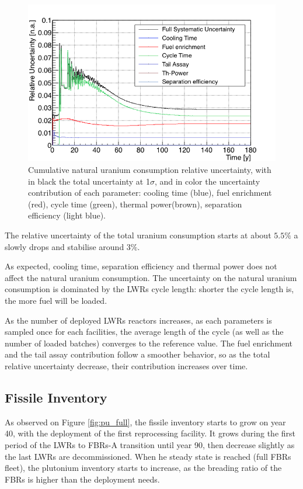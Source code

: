 \documentclass{anstrans}
\begin{document}
\begin{figure}[h!!] %
    \centering
    \includegraphics[scale=0.35]{unat_uncer}
    \caption{Cumulative natural uranium consumption relative uncertainty, with
    in black the total uncertainty at 1$\sigma$, and in color the uncertainty
    contribution of each parameter: cooling time (blue), fuel enrichment (red),
    cycle time (green), thermal power(brown), separation efficiency (light
    blue).}\label{fig:unatr_uncer}
\end{figure}
The relative uncertainty of the total uranium consumption starts at about
$5.5\%$ a slowly drops and stabilise around $3\%$.

As expected, cooling time, separation efficiency and thermal power does
not affect the natural uranium consumption.
The uncertainty on the natural uranium consumption is dominated by the
\glspl{LWR} cycle length: shorter the cycle length is, the more fuel will be
loaded.  

As the number of deployed \glspl{LWR} reactors increases, as each parameters is
sampled once for each facilities, the average length of the cycle (as well as
the number of loaded batches) converges to the reference value.
The fuel enrichment and the tail assay contribution follow a smoother behavior,
so as the total relative uncertainty decrease, their contribution increases over
time.

\subsection{Fissile Inventory}
As observed on Figure \ref{fig:pu_full}, the fissile inventory starts to grow on
year 40, with the deployment of the first reprocessing facility. It grows
during the first period of the \glspl{LWR} to \glspl{FBR}-A transition until
year 90, then decrease slightly as the last \glspl{LWR} are decommissioned.
When he steady state is reached (full \glspl{FBR} fleet), the plutonium
inventory starts to increase, as the breading ratio of the \glspl{FBR} is higher
than the deployment needs.
\end{document}
